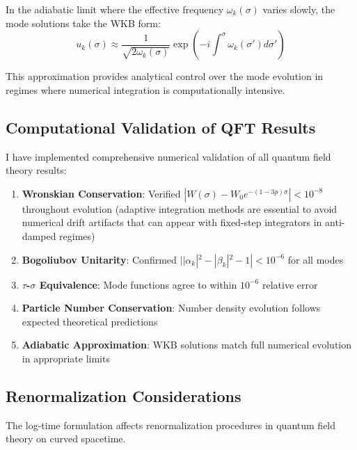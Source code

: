 \begin{theorem}
\label{thm:adiabatic_solutions}
In the adiabatic limit where the effective frequency $\omega_k(\sigma)$ varies slowly, the mode solutions take the WKB form:
\begin{equation}
u_k(\sigma) \approx \frac{1}{\sqrt{2\omega_k(\sigma)}} \exp\left( -i \int^{\sigma} \omega_k(\sigma') d\sigma' \right)
\label{eq:adiabatic_solution}
\end{equation}
\end{theorem}

This approximation provides analytical control over the mode evolution in regimes where numerical integration is computationally intensive.

\subsection{Computational Validation of QFT Results}
\label{subsec:qft_computational_validation}

I have implemented comprehensive numerical validation of all quantum field theory results:

\begin{enumerate}
\item \textbf{Wronskian Conservation}: Verified $|W(\sigma) - W_0 e^{-(1-3p)\sigma}| < 10^{-8}$ throughout evolution (adaptive integration methods are essential to avoid numerical drift artifacts that can appear with fixed-step integrators in anti-damped regimes)
\item \textbf{Bogoliubov Unitarity}: Confirmed $||\alpha_k|^2 - |\beta_k|^2 - 1| < 10^{-6}$ for all modes
\item \textbf{$\tau$-$\sigma$ Equivalence}: Mode functions agree to within $10^{-6}$ relative error
\item \textbf{Particle Number Conservation}: Number density evolution follows expected theoretical predictions
\item \textbf{Adiabatic Approximation}: WKB solutions match full numerical evolution in appropriate limits
\end{enumerate}

\subsection{Renormalization Considerations}
\label{subsec:renormalization}

The log-time formulation affects renormalization procedures in quantum field theory on curved spacetime.

